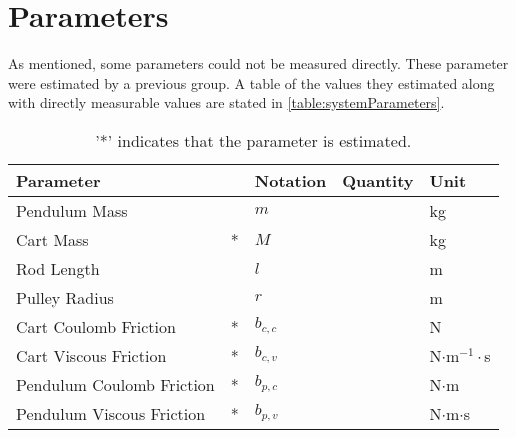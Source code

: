 \section{Parameters}
As mentioned, some parameters could not be measured directly. These parameter were estimated by a previous group\cite{JHHorgensen}. A table of the values they estimated along with directly measurable values are stated in \autoref{table:systemParameters}.

\begin{table}[H]
  \begin{tabular}{|lp{.4cm}|l|l|l|}
    \hline %
    \textbf{Parameter}        &   & \textbf{Notation} & \textbf{Quantity} & \textbf{Unit} \\
    \hline %
    Pendulum Mass             &   &   $m$             &                   &  kg           \\
    \hline %
    Cart Mass                 & * &   $M$             &                   &  kg           \\
    \hline %
    Rod Length                &   &   $l$             &                   &  m            \\
    \hline %
    Pulley Radius             &   &   $r$             &                   &  m            \\
    \hline %
    Cart Coulomb Friction     & * &   $b_{c,c}$       &                   &  N            \\
    \hline %
    Cart Viscous Friction     & * &   $b_{c,v}$       &                   &  N$\cdot$m$^{-1}\cdot$s \\
    \hline %
    Pendulum Coulomb Friction & * &   $b_{p,c}$       &                   &  N$\cdot$m              \\
    \hline %
    Pendulum Viscous Friction & * &   $b_{p,v}$       &                   &  N$\cdot$m$\cdot$s      \\
    \hline %
  \end{tabular}
  \caption{'*' indicates that the parameter is estimated.\label{table:systemParameters}}
\end{table}

